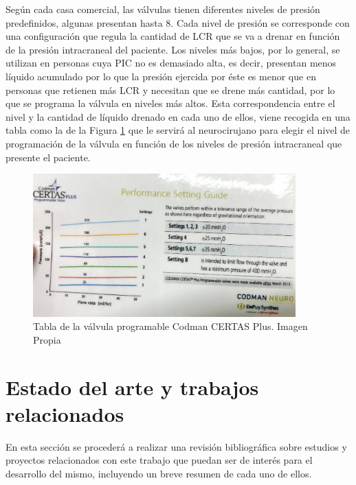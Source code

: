 Según cada casa comercial, las válvulas tienen diferentes niveles de presión predefinidos, algunas presentan hasta 8. Cada nivel de presión se corresponde con una configuración que regula la cantidad de LCR  que se va a drenar en función de la presión intracraneal del paciente. Los niveles más bajos, por lo general, se utilizan en personas cuya PIC no es demasiado alta, es decir, presentan menos líquido acumulado por lo que la presión ejercida por éste es menor que en personas que retienen más LCR y necesitan que se drene más cantidad, por lo que se programa la válvula en niveles más altos. Esta correspondencia entre el nivel y la cantidad de líquido drenado en cada uno de ellos, viene recogida en una tabla como la de la Figura \ref{fig:tab_ajuste} que le servirá al neurocirujano para elegir el nivel de programación de la válvula en función de los niveles de presión intracraneal que presente el paciente.
\begin{figure}[h]
    \centering
    \includegraphics[width=0.9\textwidth]{img/tab_ajuste.PNG}
    \caption{Tabla de la válvula programable Codman CERTAS Plus. Imagen Propia }
    \label{fig:tab_ajuste}
\end{figure}




\section{Estado del arte y trabajos relacionados}
En esta sección se procederá a realizar una revisión bibliográfica sobre estudios y proyectos relacionados con este trabajo que puedan ser de interés para el desarrollo del mismo, incluyendo un breve resumen de cada uno de ellos.

